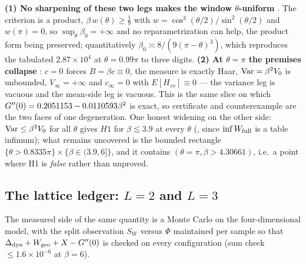 \textbf{(1) No sharpening of these two legs makes the window $\theta$-uniform} \LN. The criterion is a
product, $\beta\,w(\theta)\ge\tfrac19$ with $w=\cos^{3}(\theta/2)/\sin^{2}(\theta/2)$ and $w(\pi)=0$, so
$\sup_{\theta}\beta_{0}=+\infty$ and no reparametrization can help, the product form being preserved;
quantitatively $\beta_{0}\asymp8/(9(\pi-\theta)^{3})$, which reproduces the tabulated
$2.87\times10^{4}$ at $\theta=0.99\pi$ to three digits. \textbf{(2) At $\theta=\pi$ the premises
collapse} \LM: $c=0$ forces $B=\beta c\equiv0$, the measure is exactly Haar, $\operatorname{Var}=\beta^{2}V_{0}$ is
unbounded, $V_{\infty}=+\infty$ and $c_{\infty}=0$ with $E[H_{vv}]\equiv0$ --- the variance leg is
vacuous and the mean-side leg is vacuous. This is the same slice on which
$G''(0)=0.2051153-0.0110593\beta^{2}$ is exact, so certificate and counterexample are the two faces of
one degeneration. One honest widening on the other side: $\operatorname{Var}\le\beta^{2}V_{0}$ for all $\theta$ gives
$H1$ for $\beta\lesssim3.9$ at every $\theta$ (\LC, since $\inf W_{\mathrm{full}}$ is a table infimum); what remains
uncovered is the bounded rectangle $\{\theta>0.8335\pi\}\times\{\beta\in(3.9,6]\}$, and it contains
$(\theta=\pi,\beta>4.30661)$, i.e.\ a point where H1 is \emph{false} rather than unproved.

\subsection{The lattice ledger: $L=2$ and $L=3$}
\label{sec:lattice-ledger}

The measured side of the same quantity is a Monte Carlo on the four-dimensional model, with the split
observation $S_{W}$ versus $\Phi$ maintained per sample so that
$\Delta_{\mathrm{dyn}}+W_{\mathrm{geo}}+X-G''(0)$ is checked on every configuration (sum check $\le1.6\times10^{-6}$
at $\beta=6$).

